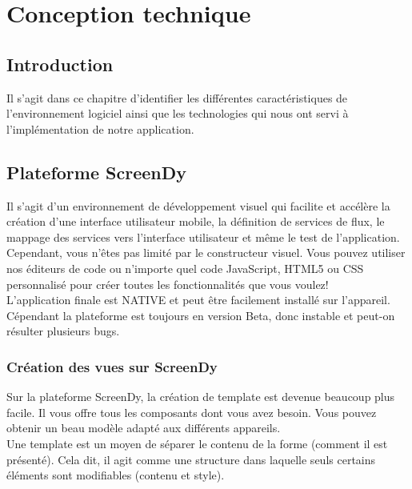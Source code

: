 \documentclass[12pt,a4paper]{report}
\begin{document}
		















		\chapter{Conception technique}
		

		\section{Introduction}
Il s’agit dans ce chapitre d’identifier les différentes caractéristiques de l’environnement logiciel ainsi que les technologies qui nous ont servi à l’implémentation de notre application.		
		
		
		\section{Plateforme ScreenDy}
Il s'agit d'un environnement de développement visuel qui facilite et accélère la création d'une interface utilisateur mobile, la définition de services de flux, le mappage des services vers l'interface utilisateur et même le test de l'application. Cependant, vous n'êtes pas limité par le constructeur visuel. Vous pouvez utiliser nos éditeurs de code ou n'importe quel code JavaScript, HTML5 ou CSS personnalisé pour créer toutes les fonctionnalités que vous voulez!\\
L'application finale est NATIVE et peut être facilement installé sur l'appareil.\\
Cépendant la plateforme est toujours en version Beta, donc instable et peut-on résulter plusieurs bugs.

		\subsection{Création des vues sur ScreenDy}
Sur la plateforme ScreenDy, la création de template est devenue beaucoup plus facile. Il vous offre tous les composants dont vous avez besoin. Vous pouvez obtenir un beau modèle adapté aux différents appareils.\\
Une template est un moyen de séparer le contenu de la forme (comment il est présenté). Cela dit, il agit comme une structure dans laquelle seuls certains éléments sont modifiables (contenu et style).
		
\end{document}
